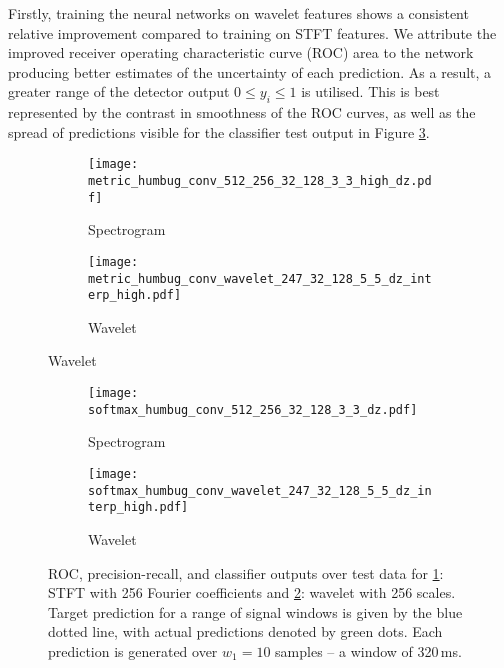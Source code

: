 \documentclass[10pt, twocolumn]{llncs}
\begin{document}
Firstly, training the neural networks on wavelet features shows a consistent relative improvement compared to training on STFT features. We attribute the improved receiver operating characteristic curve (ROC) area to the network producing better estimates of the uncertainty of each prediction. As a result, a greater range of the detector output $0\leq y_i \leq1$ is utilised. This is best represented by the contrast in smoothness of the ROC curves, as well as the spread of predictions visible for the classifier test output in Figure \ref{fig:results}. 

\begin{figure}
  \begin{subfigure}[t]{1.\columnwidth}
    \centering
    \texttt{[image: metric\_humbug\_conv\_512\_256\_32\_128\_3\_3\_high\_dz.pdf]}
    \caption{Spectrogram}
  \end{subfigure}
  \begin{subfigure}[t]{1.\columnwidth}
  \centering
    \texttt{[image: metric\_humbug\_conv\_wavelet\_247\_32\_128\_5\_5\_dz\_interp\_high.pdf]}
    \caption{Wavelet}
  \end{subfigure}
\end{figure}
\begin{figure}
  \begin{subfigure}[t]{1.\columnwidth}
    \centering
    \texttt{[image: softmax\_humbug\_conv\_512\_256\_32\_128\_3\_3\_dz.pdf]}
    \caption{Spectrogram}
    \label{fig:subfig:a}
  \end{subfigure}
  \begin{subfigure}[t]{1.\columnwidth}
  \centering
    \texttt{[image: softmax\_humbug\_conv\_wavelet\_247\_32\_128\_5\_5\_dz\_interp\_high.pdf]}
    \caption{Wavelet}
    \label{fig:subfig:b}
  \end{subfigure}
  \caption{ROC, precision-recall, and classifier outputs over test data for \ref{fig:subfig:a}: STFT with 256 Fourier coefficients and \ref{fig:subfig:b}: wavelet with 256 scales. Target prediction for a range of signal windows is given by the blue dotted line, with actual predictions denoted by green dots. Each prediction is generated over $w_1 = 10$  samples -- a window  of 320\,ms.%
  } 

    \label{fig:results}

\end{figure}
\end{document}
